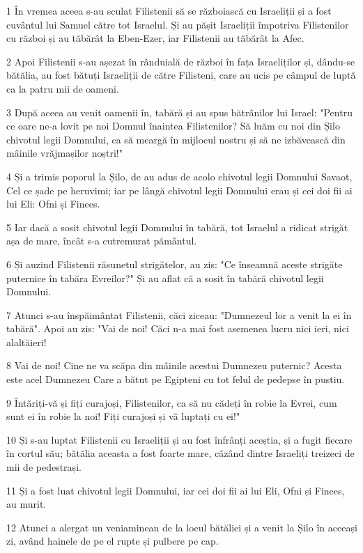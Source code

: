 \par 1 În vremea aceea s-au sculat Filistenii să se războiască cu Israeliții și a fost cuvântul lui Samuel către tot Israelul. Și au pășit Israeliții împotriva Filistenilor cu război și au tăbărât la Eben-Ezer, iar Filistenii au tăbărât la Afec.
\par 2 Apoi Filistenii s-au așezat în rânduială de război în fața Israeliților și, dându-se bătălia, au fost bătuți Israeliții de către Filisteni, care au ucis pe câmpul de luptă ca la patru mii de oameni.
\par 3 După aceea au venit oamenii în, tabără și au spus bătrânilor lui Israel: "Pentru ce oare ne-a lovit pe noi Domnul înaintea Filistenilor? Să luăm cu noi din Șilo chivotul legii Domnului, ca să meargă în mijlocul nostru și să ne izbăvească din mâinile vrăjmașilor noștri!"
\par 4 Și a trimis poporul la Șilo, de au adus de acolo chivotul legii Domnului Savaot, Cel ce șade pe heruvimi; iar pe lângă chivotul legii Domnului erau și cei doi fii ai lui Eli: Ofni și Finees.
\par 5 Iar dacă a sosit chivotul legii Domnului în tabără, tot Israelul a ridicat strigăt așa de mare, încât s-a cutremurat pământul.
\par 6 Și auzind Filistenii răsunetul strigătelor, au zis: "Ce înseamnă aceste strigăte puternice în tabăra Evreilor?" Și au aflat că a sosit în tabără chivotul legii Domnului.
\par 7 Atunci s-au înspăimântat Filistenii, căci ziceau: "Dumnezeul lor a venit la ei în tabără". Apoi au zis: "Vai de noi! Căci n-a mai fost asemenea lucru nici ieri, nici alaltăieri!
\par 8 Vai de noi! Cine ne va scăpa din mâinile acestui Dumnezeu puternic? Acesta este acel Dumnezeu Care a bătut pe Egipteni cu tot felul de pedepse în pustiu.
\par 9 Întăriți-vă și fiți curajoși, Filistenilor, ca să nu cădeți în robie la Evrei, cum sunt ei în robie la noi! Fiți curajoși și vă luptați cu ei!"
\par 10 Și s-au luptat Filistenii cu Israeliții și au fost înfrânți aceștia, și a fugit fiecare în cortul său; bătălia aceasta a fost foarte mare, căzând dintre Israeliți treizeci de mii de pedestrași.
\par 11 Și a fost luat chivotul legii Domnului, iar cei doi fii ai lui Eli, Ofni și Finees, au murit.
\par 12 Atunci a alergat un veniaminean de la locul bătăliei și a venit la Șilo în aceeași zi, având hainele de pe el rupte și pulbere pe cap.
